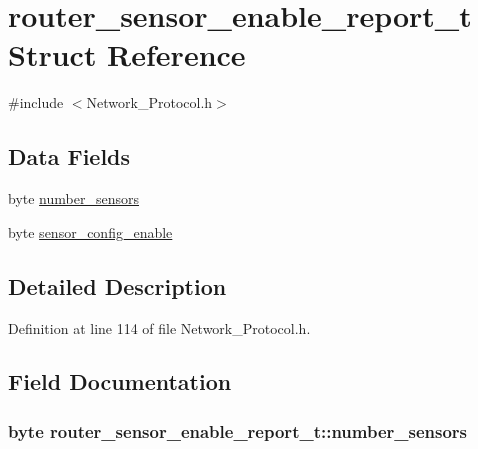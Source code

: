 \hypertarget{structrouter__sensor__enable__report__t}{\section{router\-\_\-sensor\-\_\-enable\-\_\-report\-\_\-t Struct Reference}
\label{structrouter__sensor__enable__report__t}
}


{\ttfamily \#include $<$Network\-\_\-\-Protocol.\-h$>$}

\subsection*{Data Fields}
\begin{DoxyCompactItemize}
\item 
byte \hyperlink{structrouter__sensor__enable__report__t_a993ec4c5a7a73ad3efc341eb8647f7f9}{number\-\_\-sensors}
\item 
byte \hyperlink{structrouter__sensor__enable__report__t_a8d502724424b38506c3c54950b427b68}{sensor\-\_\-config\-\_\-enable}
\end{DoxyCompactItemize}


\subsection{Detailed Description}


Definition at line 114 of file Network\-\_\-\-Protocol.\-h.



\subsection{Field Documentation}
\hypertarget{structrouter__sensor__enable__report__t_a993ec4c5a7a73ad3efc341eb8647f7f9}{
\subsubsection[{number\-\_\-sensors}]{\setlength{\rightskip}{0pt plus 5cm}byte router\-\_\-sensor\-\_\-enable\-\_\-report\-\_\-t\-::number\-\_\-sensors}}\label{structrouter__sensor__enable__report__t_a993ec4c5a7a73ad3efc341eb8647f7f9}



